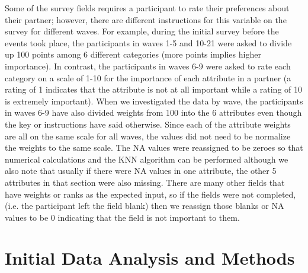 \documentclass{article}
\begin{document}
Some of the survey fields requires a participant to rate their preferences about their partner; however, there are different instructions for this variable on the survey for different waves.  For example, during the initial survey before the events took place, the participants in waves 1-5 and 10-21 were asked to divide up 100 points among 6 different categories (more points implies higher importance).  In contrast, the participants in waves 6-9 were asked to rate each category on a scale of 1-10 for the importance of each attribute in a partner (a rating of 1 indicates that the attribute is not at all important while a rating of 10 is extremely important).  When we investigated the data by wave, the participants in waves 6-9 have also divided weights from 100 into the 6 attributes even though the key or instructions have said otherwise. Since each of the attribute weights are all on the same scale for all waves, the values did not need to be normalize the weights to the same scale.  The NA values were reassigned to be zeroes so that numerical calculations and the KNN algorithm can be performed although we also note that usually if there were NA values in one attribute, the other 5 attributes in that section were also missing.  There are many other fields that have weights or ranks as the expected input, so if the fields were not completed, (i.e. the participant left the field blank) then we reassign those blanks or NA values to be 0 indicating that the field is not important to them.\\



\section{Initial Data Analysis and Methods}
\end{document}
